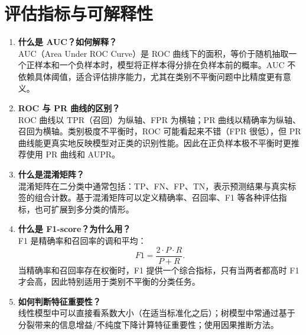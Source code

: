 \documentclass{article}
\begin{document}
\section{评估指标与可解释性}
\begin{enumerate}
\item \textbf{什么是 AUC？如何解释？}\\
AUC（Area Under ROC Curve）是 ROC 曲线下的面积，等价于随机抽取一个正样本和一个负样本时，模型将正样本得分排在负样本前的概率。AUC 不依赖具体阈值，适合评估排序能力，尤其在类别不平衡问题中比精度更有意义。

\item \textbf{ROC 与 PR 曲线的区别？}\\
ROC 曲线以 TPR（召回）为纵轴、FPR 为横轴；PR 曲线以精确率为纵轴、召回为横轴。类别极度不平衡时，ROC 可能看起来不错（FPR 很低），但 PR 曲线能更真实地反映模型对正类的识别性能。因此在正负样本极不平衡时更推荐使用 PR 曲线和 AUPR。

\item \textbf{什么是混淆矩阵？}\\
混淆矩阵在二分类中通常包括：TP、FN、FP、TN，表示预测结果与真实标签的组合计数。基于混淆矩阵可以定义精确率、召回率、F1 等各种评估指标，也可扩展到多分类的情形。

\item \textbf{什么是 F1-score？为什么用？}\\
F1 是精确率和召回率的调和平均：
\[
F1 = \frac{2 \cdot P \cdot R}{P+R}.
\]
当精确率和召回率存在权衡时，F1 提供一个综合指标，只有当两者都高时 F1 才会高，因此特别适用于类别不平衡的分类任务。

\item \textbf{如何判断特征重要性？}\\
线性模型中可以直接看系数大小（在适当标准化之后）；树模型中常通过基于分裂带来的信息增益/不纯度下降计算特征重要性；使用因果推断方法。
\end{enumerate}
\end{document}
